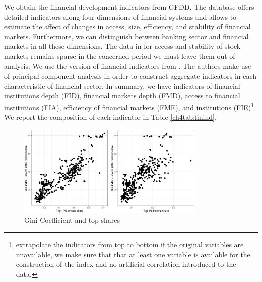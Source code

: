 \documentclass[preprint, nonatbib, 10pt]{elsarticle}
\begin{document}
We obtain the financial development indicators from \ac{GFDD}. The database offers detailed indicators along four dimensions of financial systems and allows to estimate the affect of changes in access, size, efficiency, and stability of financial markets. Furthermore, we can distinguish between banking sector and financial markets in all these dimensions. The data in for access and stability of stock markets remains sparse in the concerned period we must leave them out of analysis. We use the version of financial indicators from \cite{svirydzenka2016introducing}. The authors make use of principal component analysis in order to construct aggregate indicators in each characteristic of financial sector. In summary, we have indicators of financial institutions depth (FID), financial markets depth (FMD), access to financial institutions (FIA), efficiency of financial markets (FME), and institutions (FIE)\footnote{\textcite{svirydzenka2016introducing} extrapolate the indicators from top to bottom if the original variables are unavailable, we make sure that that at least one variable is available for the construction of the index and no artificial correlation introduced to the data.}. We report the composition of each indicator in Table \ref{ch4tab:finind}. 

\begin{figure}[ht!]
  \centering
  \includegraphics[width=0.8\textwidth, keepaspectratio]{figures/plots_ineq}
  \caption{Gini Coefficient and top shares}
  \label{ch4fig:gini_topshares}
\end{figure}

\end{document}
